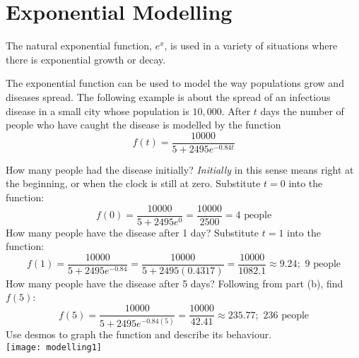 \section{Exponential Modelling}
The natural exponential function, $e^x$, is used in a variety of situations where there is exponential growth or decay. 

\example The exponential function can be used to model the way populations grow and diseases spread. The following
example is about the spread of an infectious disease in a small city whose population is $10,000$. After $t$ days the number of people who have caught the disease is modelled by the function
\begin{equation*}f (t) =\frac{10000}{5 +2495 e^{ -0.84 t}}
\end{equation*}


\begin{tasks}
	\task How many people had the disease initially?
	\textit{Initially} in this sense means right at the beginning, or when the clock is still at zero. Substitute $t=0$ into the function:
	\[f(0)=\frac{10000}{5+2495e^0}=\frac{10000}{2500}=4\text{ people}\]
	\task How many people have the disease after 1 day?
	Substitute $t=1$ into the function:
	\[f(1)=\frac{10000}{5+2495e^{-0.84}}=\frac{10000}{5+2495(0.4317)}=\frac{10000}{1082.1}\approx 9.24;\text{ 9 people}\]
	\task How many people have the disease after 5 days? 
	Following from part (b), find $f(5)$:\\
	\[f(5)=\frac{10000}{5+2495e^{-0.84(5)}}=\frac{10000}{42.41}\approx 235.77;\text{ 236 people}\]	
	\task Use desmos to graph the function and describe its behaviour. \\
	\texttt{[image: modelling1]}
\end{tasks}

